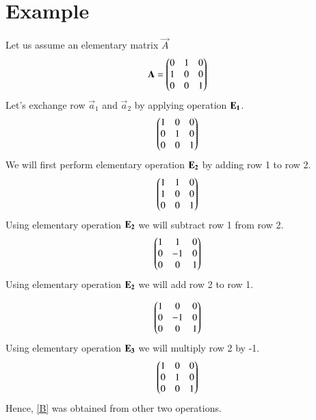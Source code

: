 \documentclass[journal,12pt,twocolumn]{IEEEtran}
\begin{document}
  \section{\textbf{Example}}
  Let us assume an elementary  matrix $\vec{A}$  
 \begin{align}
 \mathbf{A}=\begin{pmatrix}0&1&0\\1&0&0\\0&0&1\end{pmatrix}
  \end{align}
 Let's exchange row $\vec{a}_1$ and $\vec{a}_2$ by applying operation $\bf{E}_1$.
 \begin{align}
\begin{pmatrix}1&0&0\\0&1&0\\0&0&1\end{pmatrix}\label{B}
 \end{align}
We will first perform elementary operation $\bf{E}_2$ by adding row 1 to row 2.
 \begin{align}
\begin{pmatrix}1&1&0\\1&0&0\\0&0&1\end{pmatrix}
 \end{align}
 Using elementary operation $\bf{E}_2$ we will subtract row 1 from row 2.
  \begin{align}
 \begin{pmatrix}1&1&0\\0&-1&0\\0&0&1\end{pmatrix}
 \end{align}
 Using elementary operation $\bf{E}_2$ we will add row 2 to row 1.
   
 \begin{align}
 \begin{pmatrix}1&0&0\\0&-1&0\\0&0&1\end{pmatrix}
 \end{align}
 Using elementary operation $\bf{E}_3$ we will multiply row 2 by -1.
 \begin{align}
\begin{pmatrix}1&0&0\\0&1&0\\0&0&1\end{pmatrix}
 \end{align}
 Hence, \eqref{B} was obtained from other two operations.
  
\end{document}
